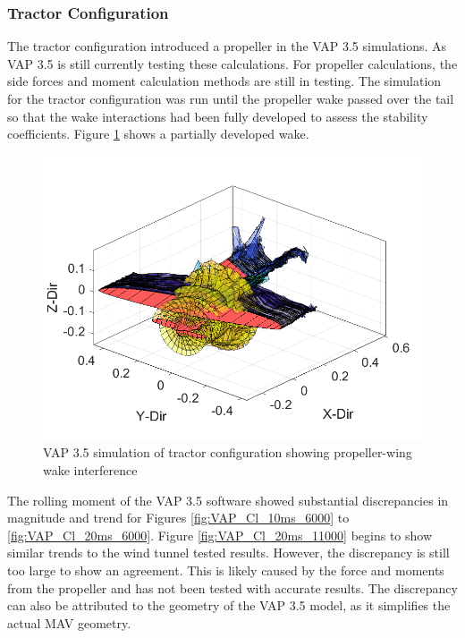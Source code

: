 \subsubsection{Tractor Configuration}

The tractor configuration introduced a propeller in the VAP 3.5 simulations. As VAP 3.5 is still currently testing these calculations. For propeller calculations, the side forces and moment calculation methods are still in testing. The simulation for the tractor configuration was run until the propeller wake passed over the tail so that the wake interactions had been fully developed to assess the stability coefficients. Figure \ref{fig:tractorwake} shows a partially developed wake.

\begin{figure}[H]
\centering
\includegraphics[width=0.5\linewidth]{05_Results/Figs/VAP/model.png}
\caption{VAP 3.5 simulation of tractor configuration showing propeller-wing wake interference}
\label{fig:tractorwake}
\end{figure}

The rolling moment of the VAP 3.5 software showed substantial discrepancies in magnitude and trend for Figures \ref{fig:VAP_Cl_10ms_6000} to \ref{fig:VAP_Cl_20ms_6000}. Figure \ref{fig:VAP_Cl_20ms_11000} begins to show similar trends to the wind tunnel tested results. However, the discrepancy is still too large to show an agreement. This is likely caused by the force and moments from the propeller and has not been tested with accurate results. The discrepancy can also be attributed to the geometry of the VAP 3.5 model, as it simplifies the actual \acrshort{MAV} geometry.


